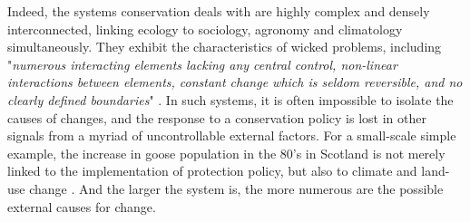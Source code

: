 \documentclass[12pt,a4paper]{article}
\begin{document}
Indeed, the systems conservation deals with are highly complex and densely interconnected, linking ecology to sociology, agronomy and climatology simultaneously. %
They exhibit the characteristics of wicked problems, including "\textit{numerous interacting elements lacking any central control, non-linear interactions between elements, constant change which is seldom reversible, and no clearly defined boundaries}" \citep{game2013conservation}.
In such systems, it is often impossible to isolate the causes of changes, and the response to a conservation policy is lost in other signals from a myriad of uncontrollable external factors.
For a small-scale simple example, the increase in goose population in the 80's in Scotland is not merely linked to the implementation of protection policy, but also to climate and land-use change \citep{mason2017changing}. And the larger the system is, the more numerous are the possible external causes for change.
\end{document}

